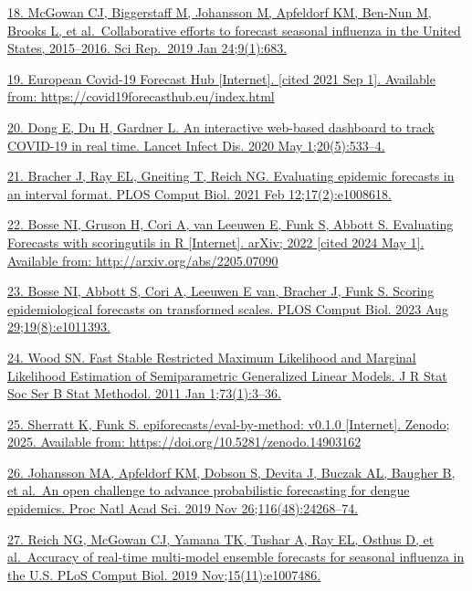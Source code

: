 \documentclass[
  letterpaper,
  DIV=11,
  numbers=noendperiod]{scrartcl}
\begin{document}
\begin{tcolorbox}
\href{https://www.zotero.org/google-docs/?7SKDbN}{18. McGowan CJ,
Biggerstaff M, Johansson M, Apfeldorf KM, Ben-Nun M, Brooks L, et
al.~Collaborative efforts to forecast seasonal influenza in the United
States, 2015--2016. Sci Rep.~2019 Jan 24;9(1):683.}

\href{https://www.zotero.org/google-docs/?7SKDbN}{19. European Covid-19
Forecast Hub {[}Internet{]}. {[}cited 2021 Sep 1{]}. Available from:
https://covid19forecasthub.eu/index.html}

\href{https://www.zotero.org/google-docs/?7SKDbN}{20. Dong E, Du H,
Gardner L. An interactive web-based dashboard to track COVID-19 in real
time. Lancet Infect Dis. 2020 May 1;20(5):533--4.}

\href{https://www.zotero.org/google-docs/?7SKDbN}{21. Bracher J, Ray EL,
Gneiting T, Reich NG. Evaluating epidemic forecasts in an interval
format. PLOS Comput Biol. 2021 Feb 12;17(2):e1008618.}

\href{https://www.zotero.org/google-docs/?7SKDbN}{22. Bosse NI, Gruson
H, Cori A, van Leeuwen E, Funk S, Abbott S. Evaluating Forecasts with
scoringutils in R {[}Internet{]}. arXiv; 2022 {[}cited 2024 May 1{]}.
Available from: http://arxiv.org/abs/2205.07090}

\href{https://www.zotero.org/google-docs/?7SKDbN}{23. Bosse NI, Abbott
S, Cori A, Leeuwen E van, Bracher J, Funk S. Scoring epidemiological
forecasts on transformed scales. PLOS Comput Biol. 2023 Aug
29;19(8):e1011393.}

\href{https://www.zotero.org/google-docs/?7SKDbN}{24. Wood SN. Fast
Stable Restricted Maximum Likelihood and Marginal Likelihood Estimation
of Semiparametric Generalized Linear Models. J R Stat Soc Ser B Stat
Methodol. 2011 Jan 1;73(1):3--36.}

\href{https://www.zotero.org/google-docs/?7SKDbN}{25. Sherratt K, Funk
S. epiforecasts/eval-by-method: v0.1.0 {[}Internet{]}. Zenodo; 2025.
Available from: https://doi.org/10.5281/zenodo.14903162}

\href{https://www.zotero.org/google-docs/?7SKDbN}{26. Johansson MA,
Apfeldorf KM, Dobson S, Devita J, Buczak AL, Baugher B, et al.~An open
challenge to advance probabilistic forecasting for dengue epidemics.
Proc Natl Acad Sci. 2019 Nov 26;116(48):24268--74.}

\href{https://www.zotero.org/google-docs/?7SKDbN}{27. Reich NG, McGowan
CJ, Yamana TK, Tushar A, Ray EL, Osthus D, et al.~Accuracy of real-time
multi-model ensemble forecasts for seasonal influenza in the U.S. PLoS
Comput Biol. 2019 Nov;15(11):e1007486.}


\end{tcolorbox}
\end{document}
